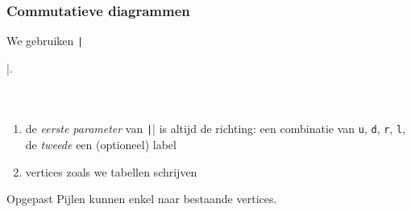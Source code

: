 \begin{frame}[fragile]
  \frametitle{Commutatieve diagrammen}

  \small
  We gebruiken \texttt|\usepackage{tikz-cd}|.
  \begin{columns}
    \begin{column}{.67\textwidth}
      \inputminted[fontsize = \scriptsize]{latex}{tikz/diagrams/1.tikz}
    \end{column}
    \begin{column}{.33\textwidth}
      
    \end{column}
  \end{columns}
  \small
  \begin{enumerate}
    \item\pause de \emph{eerste parameter} van \texttt|\arrow| is altijd de richting: een combinatie van \texttt{u}, \texttt{d}, \texttt{r}, \texttt{l}, de \emph{tweede} een (optioneel) label
    \item\pause vertices zoals we tabellen schrijven 
  \end{enumerate}
  \begin{alertblock}{Opgepast}
    \dbend\quad Pijlen kunnen enkel naar bestaande vertices.
  \end{alertblock}
\end{frame}

